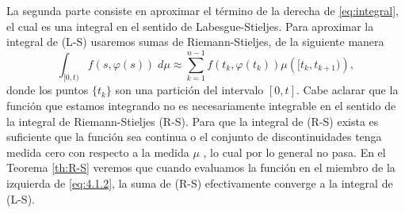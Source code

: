 La segunda parte consiste en aproximar el término de la derecha de \eqref{eq:integral}, el cual es una integral en el sentido de Labesgue-Stieljes. Para aproximar la integral de (L-S) usaremos  sumas de Riemann-Stieljes, de la siguiente manera
\begin{equation}\label{eq:4.1.2}
    \int_{[0,t)}f(s,\varphi(s))\; d\mu \approx \sum_{k=1}^{n-1}f(t_k,\varphi(t_k))\mu\left([t_k,t_{k+1})\right),
\end{equation}
donde los puntos $\{t_k\}$ son una partición del intervalo $[0,t]$. Cabe aclarar que la función  que estamos integrando no es necesariamente  integrable en el sentido de la integral de Riemann-Stieljes (R-S). Para que la integral de (R-S) exista es suficiente que la función sea continua \cite{Lakshmikan} o el conjunto de discontinuidades tenga medida cero con respecto a la medida $\mu$ \cite{Hobson}, lo cual por lo general no pasa. En el Teorema \ref{th:R-S} veremos que cuando evaluamos la función en el miembro de la izquierda  de \eqref{eq:4.1.2}, la suma de (R-S) efectivamente converge a la integral de (L-S).





